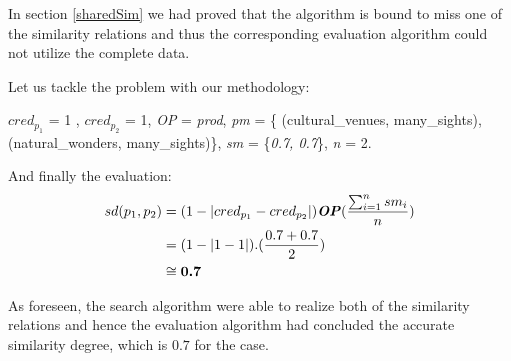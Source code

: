 In section \ref{sharedSim} we had proved that the algorithm is bound to miss one of the similarity relations and thus the corresponding evaluation algorithm could not utilize the complete data.

Let us tackle the problem with our methodology:

$cred_{p_{1}}$ = 1 , $cred_{p_{2}}$ = 1,  \emph{OP} = \textit{prod},  \textit{pm} = \{ (cultural\_venues, many\_sights), (natural\_wonders, many\_sights)\}, \textit{sm} = \{\textit{0.7, 0.7}\}, \textit{n} = 2.

And finally the evaluation:
\begin{equation}\label{eq:sdE3}
\begin{split}
\textit{$sd(p_{1}, p_{2})$} &=   (1-\lvert  \textit{$cred_{p_{1}}$} - \textit{$cred_{p_{2}}$}  \rvert) \textbf{\emph{OP}} (\frac{\sum_{i=1}^{n} sm_i}{n})\\
 &=   (1-\lvert  1 - 1  \rvert) . (\frac{0.7 + 0.7}{2}) \\
&\cong{\textbf{0.7}}
 \end{split} 
\end{equation}

As foreseen, the search algorithm were able to realize both of the similarity relations and hence the evaluation algorithm had concluded the accurate similarity degree, which is $0.7$ for the case.




